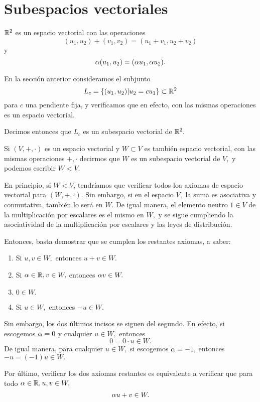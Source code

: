 \section{Subespacios vectoriales}



\begin{problema}
 $\mathbb{R}^{2}$ es un espacio vectorial con las operaciones $$(u_{1},u_{2})+(v_{1},v_{2})=(u_{1}+v_{1},u_{2}+v_{2})$$ y
$$\alpha(u_{1}, u_{2})=(\alpha u_{1}, \alpha u_{2}).$$

En la secci\'on anterior consideramos el subjunto $$L_{c}=\left\{ (u_{1},u_{2})|u_{2}=c u_{1} \right\}\subset \mathbb{R}^{2}$$ para  $c$
una pendiente fija, y verificamos que en efecto, con las mismas operaciones es un espacio vectorial.

Decimos entonces que $L_{c}$ es un subespacio vectorial de $\mathbb{R}^{2}.$
\end{problema}

\begin{defn}
 Si $(V, +, \cdot )$ es un espacio vectorial  y
$W\subset V$ es tambi\'en espacio vectorial, con las mismas operaciones $+,\cdot$ decirmos que $W$ es un subespacio
vectorial de $V,$ y podemos escribir $W < V.$
\end{defn}

En principio, si $W < V$, tendr\'iamos que verificar todos loa axiomas de espacio vectorial para $(W, +, \cdot).$ Sin
embargo, si en el espacio $V,$ la suma es asociativa y conmutativa, tambi\'en lo será en $W.$ De igual manera, el
elemento neutro $1\in V$ de la multiplicaci\'on por escalares es el mismo en $W,$ y se sigue cumpliendo la
asociatividad de la multiplicaci\'on por escalares y las leyes de distribuci\'on.

Entonces, basta demostrar que se cumplen los restantes axiomas, a saber:
\begin{enumerate}
 \item Si $u,v \in W,$ entonces $u+v\in W.$
 \item Si $\alpha \in \mathbb{R}, v \in W,$ entonces $\alpha v\in W.$
 \item $0\in W.$
 \item Si $u\in W,$ entonces $-u\in W.$
\end{enumerate}

Sin embargo, los dos últimos incisos se siguen del segundo. En efecto, si escogemos $\alpha=0$ y cualquier $u\in
W,$ entonces
$$
0=0\cdot u \in W.
$$
De igual manera, para cualquier $u\in W,$ si escogemos $\alpha=-1,$ entonces $-u=(-1)u\in W.$

Por último, verificar los dos axiomas restantes es equivalente a verificar que para todo $\alpha \in \mathbb{R}, u,v \in W,$
$$
\alpha u + v \in W.
$$

